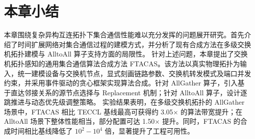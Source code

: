 \section{本章小结}

本章围绕复杂异构互连拓扑下集合通信性能难以充分发挥的问题展开研究。首先介绍了时间扩展网络对集合通信过程的建模方式，并分析了现有合成方法在多级交换机拓扑建模与 AlltoAll 算子支持方面的局限性。
针对上述问题，本章提出了交换机拓扑感知的通用集合通信算法合成方法 FTACAS。该方法以真实物理拓扑为输入，统一建模设备与交换机节点，显式刻画链路参数、交换机转发模式及端口并发约束，并采用事件驱动的贪心框架实现算法合成。针对 AllGather 算子，引入基于直达邻接关系的源节点选择与 Replacement 机制；针对 AlltoAll 算子，设计逐跳推进与动态优先级调整策略。
实验结果表明，在多级交换机拓扑的 AllGather 场景中，FTACAS 相比 TECCL 基线最高可获得约 3.05$\times$ 的算法带宽提升；在 AlltoAll 场景下整体性能相当，部分配置可达 1.50$\times$ 提升。同时，FTACAS 的合成时间相比基线降低了 $10^{2}\!-\!10^{4}$ 倍，显著提升了工程可用性。
